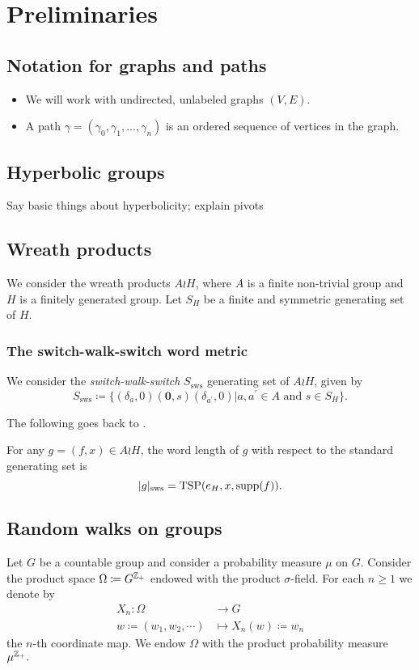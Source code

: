 \section{Preliminaries}
\subsection{Notation for graphs and paths}
\begin{itemize}
	\item We will work with undirected, unlabeled graphs $(V,E)$.
	\item A path $\gamma=(\gamma_0,\gamma_1,\ldots, \gamma_n)$ is an ordered sequence of vertices in the graph.
\end{itemize}

\subsection{Hyperbolic groups}
Say basic things about hyperbolicity; explain pivots

\subsection{Wreath products}
We consider the wreath products $A\wr H$, where $A$ is a finite non-trivial group and $H$ is a finitely generated group. Let $S_H$ be a finite and symmetric generating set of $H$. 

\subsubsection{The switch-walk-switch word metric}\label{subsubsection: the sws word metric}
We consider the \emph{switch-walk-switch} $S_{\mathrm{sws}}$ generating set of $A\wr H$, given by
\[
S_{\mathrm{sws}}\coloneqq \Big\{ (\delta_a,0)(\mathbf{0},s)(\delta_{a^{\prime}},0)\Big| a,a^{\prime}\in A\text{ and }s\in S_H \Big\}.
\]

The following goes back to \cite[Theorem 1.2]{Parry1992}.
\begin{prop}
For any $g=(f,x)\in A\wr H$, the word length of $g$ with respect to the standard generating set is
	\[
	|g|_{\mathrm{sws}}=\mathrm{TSP}(e_H,x,\mathrm{supp}(f)).
	\]
\end{prop}


\subsection{Random walks on groups}
 Let $G$ be a countable group and consider a probability measure $\mu$ on $G$. Consider the product space $\Omega\coloneqq G^{\mathbb{Z}_{+}}$ endowed with the product $\sigma$-field. For each $n\ge 1$ we denote by
	\begin{equation*}
		\begin{aligned}
			X_n:\Omega&\to G\\
			w\coloneqq(w_1,w_2,\cdots)&\mapsto X_n(w)\coloneqq w_n
	\end{aligned}
	\end{equation*}
	the $n$-th coordinate map. We endow $\Omega$ with the product probability measure $\mu^{\mathbb{Z}_{+}}.$
		
